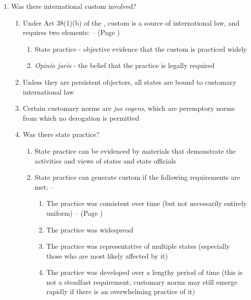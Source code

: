 \begin{enumerate}
\begin{enumerate}
    \end{enumerate}
    \item Was there international custom involved?
    \begin{enumerate}
        \item Under Art 38(1)(b) of the , custom is a source of international law, and requires two elements: --  (Page \pageref{case:North Sea Continental Shelf})
        \begin{enumerate}
            \item State practice - objective evidence that the custom is practiced widely
            \item \textit{Opinio juris} - the belief that the practice is legally required
        \end{enumerate}
        \item Unless they are persistent objectors, all states are bound to customary international law
        \item Certain customary norms are \textit{jus cogens}, which are peremptory norms from which no derogation is permitted
        \item Was there state practice?
        \begin{enumerate}
            \item State practice can be evidenced by materials that demonstrate the activities and views of states and state officials
            \item State practice can generate custom if the following requirements are met: -- 
            \begin{enumerate}
                \item The practice was consistent over time (but not necessarily entirely uniform) --  (Page \pageref{case:Military and paramilitary activities in Nicaragua})
                \item The practice was widespread
                \item The practice was representative of multiple states (especially those who are most likely affected by it)
                \item The practice was developed over a lengthy period of time (this is not a steadfast requirement; customary norms may still emerge rapidly if there is an overwhelming practice of it)

\end{enumerate}
\end{enumerate}
\end{enumerate}
\end{enumerate}
